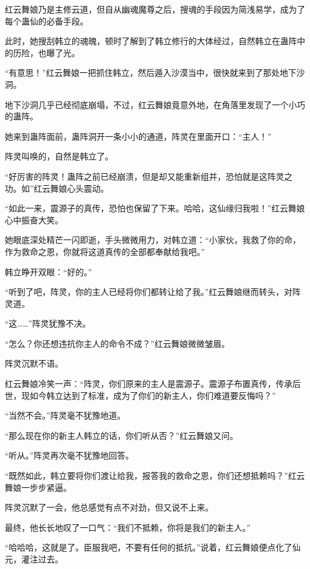 
\begin{this_body}

红云舞娘乃是主修云道，但自从幽魂魔尊之后，搜魂的手段因为简浅易学，成为了每个蛊仙的必备手段。

此时，她搜刮韩立的魂魄，顿时了解到了韩立修行的大体经过，自然韩立在蛊阵中的历险，也曝了光。

“有意思！”红云舞娘一把抓住韩立，然后遁入沙漠当中，很快就来到了那处地下沙洞。

地下沙洞几乎已经彻底崩塌，不过，红云舞娘竟意外地，在角落里发现了一个小巧的蛊阵。

她来到蛊阵面前，蛊阵洞开一条小小的通道，阵灵在里面开口：“主人！”

阵灵叫唤的，自然是韩立了。

“好厉害的阵灵！蛊阵之前已经崩溃，但是却又能重新组并，恐怕就是这阵灵之功。如”红云舞娘心头震动。

“如此一来，震源子的真传，恐怕也保留了下来。哈哈，这仙缘归我啦！”红云舞娘心中振奋大笑。

她眼底深处精芒一闪即逝，手头微微用力，对韩立道：“小家伙，我救了你的命，作为救命之恩，你就将这道真传的全部都奉献给我吧。”

韩立睁开双眼：“好的。”

“听到了吧，阵灵，你的主人已经将你们都转让给了我。”红云舞娘继而转头，对阵灵道。

“这……”阵灵犹豫不决。

“怎么？你还想违抗你主人的命令不成？”红云舞娘微微皱眉。

阵灵沉默不语。

红云舞娘冷笑一声：“阵灵，你们原来的主人是震源子。震源子布置真传，传承后世，现如今韩立达到了标准，成为了你们的新主人，你们难道要反悔吗？”

“当然不会。”阵灵毫不犹豫地道。

“那么现在你的新主人韩立的话，你们听从否？”红云舞娘又问。

“听从。”阵灵再次毫不犹豫地回答。

“既然如此，韩立要将你们渡让给我，报答我的救命之恩，你们还想抵赖吗？”红云舞娘一步步紧逼。

阵灵沉默了一会，他总感觉有点不对劲，但又说不上来。

最终，他长长地叹了一口气：“我们不抵赖，你将是我们的新主人。”

“哈哈哈，这就是了。臣服我吧，不要有任何的抵抗。”说着，红云舞娘便点化了仙元，灌注过去。


\end{this_body}
